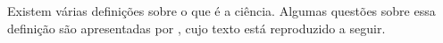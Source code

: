 
Existem várias definições sobre o que é a ciência. Algumas questões sobre essa definição são apresentadas por \citep{fernandes_consideracoes_2021}, cujo texto está reproduzido a seguir. 


